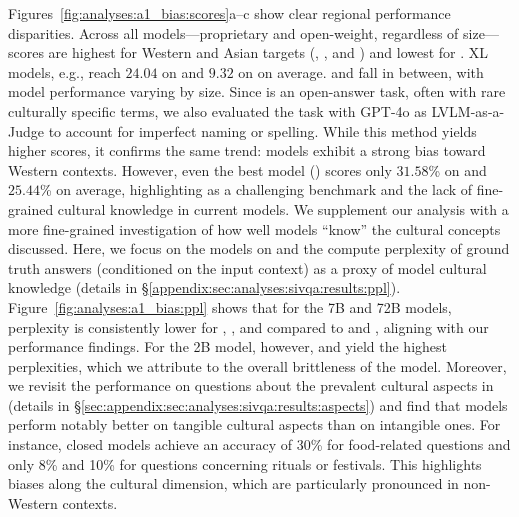\rrparagraph{\sivqa \& \vvqa}
%
Figures~\ref{fig:analyses:a1_bias:scores}a–c show clear regional performance disparities.
%
Across all models---proprietary and open-weight, regardless of size---scores are highest for Western and Asian targets (\RegW, \RegE, and \RegAP) and lowest for \RegSA.
%
XL models, e.g., reach $24.04$ on \RegW and $9.32$ on \RegSA on average.
%
\RegA and \RegLAC fall in between, with model performance varying by size.
%
Since \sivqa is an open-answer task, often with rare culturally specific terms, we also evaluated the task with GPT-4o as LVLM-as-a-Judge to account for imperfect naming or spelling.
%
While this method yields higher scores, it confirms the same trend: models exhibit a strong bias toward Western contexts.
%
However, even the best model () scores only $31.58$\% on \RegW and $25.44$\% on average, highlighting \dsname as a challenging benchmark and the lack of fine-grained cultural knowledge in current models.
%
We supplement our analysis with a more fine-grained investigation of how well models ``know'' the cultural concepts discussed.
%
Here, we focus on the  models on \sivqa and the compute perplexity of ground truth answers (conditioned on the input context) as a proxy of model cultural knowledge (details in \S\ref{appendix:sec:analyses:sivqa:results:ppl}). 
%
Figure~\ref{fig:analyses:a1_bias:ppl} shows that for the 7B and 72B models, perplexity is consistently lower for \RegW, \RegE, and \RegAP compared to \RegA and \RegSA, aligning with our performance findings.
%
For the 2B model, however, \RegE and \RegSA yield the highest perplexities, which we attribute to the overall brittleness of the model.
%
Moreover, we revisit the performance on questions about the prevalent cultural aspects in \sivqa (details in \S\ref{sec:appendix:sec:analyses:sivqa:results:aspects}) and find that models perform notably better on tangible cultural aspects than on intangible ones.
%
For instance, closed models achieve an accuracy of 30\% for food-related questions and only 8\% and 10\% for questions concerning rituals or festivals.
%
This highlights biases along the cultural dimension, which are particularly pronounced in non-Western contexts.
%

%
%

